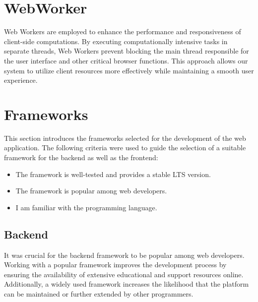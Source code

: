 \cite{methodology:websockets1, methodology:websockets2, methodology:websockets3}

\section{WebWorker}
\label{sec:methodology:webworker}
Web Workers are employed to enhance the performance and responsiveness of client-side computations. By executing computationally intensive tasks in separate threads, Web Workers prevent blocking the main thread responsible for the user interface and other critical browser functions. This approach allows our system to utilize client resources more effectively while maintaining a smooth user experience.

\cite{methodology:webworkers}

\section{Frameworks}
\label{sec:methodology:frameworks}
This section introduces the frameworks selected for the development of the web application. The following criteria were used to guide the selection of a suitable framework for the backend as well as the frontend:
\begin{itemize}
    \item The framework is well-tested and provides a stable \ac{LTS} version.
    \item The framework is popular among web developers.
    \item I am familiar with the programming language.
\end{itemize}

\subsection{Backend}
\label{subsec:methodology:frameworks:backend}
It was crucial for the backend framework to be popular among web developers. Working with a popular framework improves the development process by ensuring the availability of extensive educational and support resources online. Additionally, a widely used framework increases the likelihood that the platform can be maintained or further extended by other programmers.

